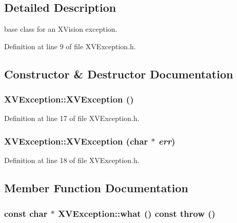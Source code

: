 \subsection{Detailed Description}
base class for an XVision exception.





Definition at line 9 of file XVException.h.

\subsection{Constructor \& Destructor Documentation}
\label{XVException_a0}
\hypertarget{class_XVException_a0}{
\subsubsection[XVException]{\setlength{\rightskip}{0pt plus 5cm}XVException::XVException ()}}




Definition at line 17 of file XVException.h.\label{XVException_a1}
\hypertarget{class_XVException_a1}{
\subsubsection[XVException]{\setlength{\rightskip}{0pt plus 5cm}XVException::XVException (char $\ast$ {\em err})}}




Definition at line 18 of file XVException.h.

\subsection{Member Function Documentation}
\label{XVException_a2}
\hypertarget{class_XVException_a2}{
\subsubsection[what]{\setlength{\rightskip}{0pt plus 5cm}const char $\ast$ XVException::what () const  throw ()}}




